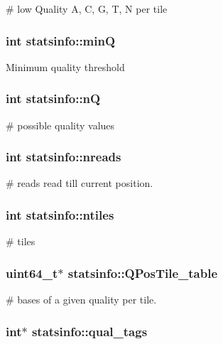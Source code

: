 \# low Quality A, C, G, T, N per tile \hypertarget{structstatsinfo_a6b33794a27827b8e2ea2b45a95f937d9}{
\subsubsection[{min\+Q}]{\setlength{\rightskip}{0pt plus 5cm}int statsinfo\+::min\+Q}}\label{structstatsinfo_a6b33794a27827b8e2ea2b45a95f937d9}
Minimum quality threshold \hypertarget{structstatsinfo_a8f99f5ac1c3643e6ad59f124c11676e2}{
\subsubsection[{n\+Q}]{\setlength{\rightskip}{0pt plus 5cm}int statsinfo\+::n\+Q}}\label{structstatsinfo_a8f99f5ac1c3643e6ad59f124c11676e2}
\# possible quality values \hypertarget{structstatsinfo_a2f01e91b444793507cb4173582e215bb}{
\subsubsection[{nreads}]{\setlength{\rightskip}{0pt plus 5cm}int statsinfo\+::nreads}}\label{structstatsinfo_a2f01e91b444793507cb4173582e215bb}
\# reads read till current position. \hypertarget{structstatsinfo_abcfe8e12737ac99b724d4d4407204ec8}{
\subsubsection[{ntiles}]{\setlength{\rightskip}{0pt plus 5cm}int statsinfo\+::ntiles}}\label{structstatsinfo_abcfe8e12737ac99b724d4d4407204ec8}
\# tiles \hypertarget{structstatsinfo_af2781fc5113bab8c208921a221e2c834}{
\subsubsection[{Q\+Pos\+Tile\+\_\+table}]{\setlength{\rightskip}{0pt plus 5cm}uint64\+\_\+t$\ast$ statsinfo\+::\+Q\+Pos\+Tile\+\_\+table}}\label{structstatsinfo_af2781fc5113bab8c208921a221e2c834}
\# bases of a given quality per tile. \hypertarget{structstatsinfo_a2fc7cfbe32bd01653402ff070638292b}{
\subsubsection[{qual\+\_\+tags}]{\setlength{\rightskip}{0pt plus 5cm}int$\ast$ statsinfo\+::qual\+\_\+tags}}\label{structstatsinfo_a2fc7cfbe32bd01653402ff070638292b}
